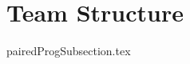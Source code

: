 \documentclass[class= article, crop=false]{standalone}
\title{}  %
\begin{document}
\ifstandalone
\maketitle %
\clearpage
\tableofcontents %
\fi


\section{Team Structure}

{pairedProgSubsection.tex}
\end{document}
